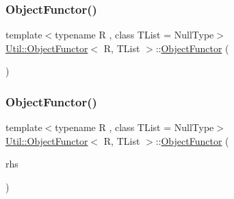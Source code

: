 \subsubsection{\texorpdfstring{ObjectFunctor()}{ObjectFunctor()}\hspace{0.1cm}{\footnotesize\ttfamily [1/10]}}
{\footnotesize\ttfamily template$<$typename R , class T\+List  = Null\+Type$>$ \\
\mbox{\hyperlink{classUtil_1_1ObjectFunctor}{Util\+::\+Object\+Functor}}$<$ R, T\+List $>$\+::\mbox{\hyperlink{classUtil_1_1ObjectFunctor}{Object\+Functor}} (\begin{DoxyParamCaption}{ }\end{DoxyParamCaption})\hspace{0.3cm}{\ttfamily [inline]}}

\mbox{\label{classUtil_1_1ObjectFunctor_a2d42842ec3d69b317aaaafd65cd9e2fd}} 
\subsubsection{\texorpdfstring{ObjectFunctor()}{ObjectFunctor()}\hspace{0.1cm}{\footnotesize\ttfamily [2/10]}}
{\footnotesize\ttfamily template$<$typename R , class T\+List  = Null\+Type$>$ \\
\mbox{\hyperlink{classUtil_1_1ObjectFunctor}{Util\+::\+Object\+Functor}}$<$ R, T\+List $>$\+::\mbox{\hyperlink{classUtil_1_1ObjectFunctor}{Object\+Functor}} (\begin{DoxyParamCaption}\item[{const \mbox{\hyperlink{classUtil_1_1ObjectFunctor}{Object\+Functor}}$<$ R, T\+List $>$ \&}]{rhs }\end{DoxyParamCaption})\hspace{0.3cm}{\ttfamily [inline]}}

\mbox{\label{classUtil_1_1ObjectFunctor_a60702c933bbfec0d0a0e4459debe21b7}} 
